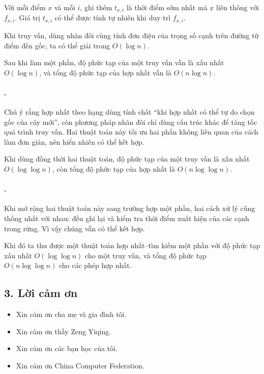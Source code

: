 \documentclass[11pt]{article}
\begin{document}
Với mỗi điểm \(x\) và mỗi \(i\), ghi thêm \(t_{x,i}\) là thời điểm sớm nhất
mà \(x\) liên thông với \(f_{x,i}\). Giá trị \(t_{x,i}\) có thể được tính tự
nhiên khi duy trì \(f_{x,i}\).

Khi truy vấn, dùng nhân đôi cùng tính đơn điệu của trọng số cạnh trên đường từ
điểm đến gốc, ta có thể giải trong \(O(\log n)\).

Sau khi làm  một phần, độ phức tạp của một truy vấn vẫn là
xấu nhất \(O(\log n)\), và tổng độ phức tạp của hợp nhất vẫn là
\(O(n\log n)\).

\paragraph{.}
Chú ý rằng hợp nhất theo hạng dùng tính chất ``khi hợp nhất có thể tự do chọn
gốc của cây mới'', còn phương pháp nhân đôi chỉ dùng cấu trúc khác để tăng tốc
quá trình truy vấn. Hai thuật toán này tối ưu hai phần không liên quan của
cách làm đơn giản, nên hiển nhiên có thể kết hợp.

Khi dùng đồng thời hai thuật toán, độ phức tạp của một truy vấn là xấu nhất
\(O(\log\log n)\), còn tổng độ phức tạp của hợp nhất là
\(O(n\log\log n)\).

\paragraph{.}
Khi mở rộng hai thuật toán này sang trường hợp  một phần, hai
cách xử lý cũng thống nhất với nhau: đều ghi lại và kiểm tra thời điểm xuất
hiện của các cạnh trong rừng. Vì vậy chúng vẫn có thể kết hợp.

Khi đó ta thu được một thuật toán hợp nhất--tìm kiếm  một
phần với độ phức tạp xấu nhất \(O(\log\log n)\) cho một truy vấn, và tổng độ
phức tạp \(O(n\log\log n)\) cho các phép hợp nhất.

\subsection*{3. Lời cảm ơn}

\begin{itemize}
  \item Xin cảm ơn cha mẹ và gia đình tôi.
  \item Xin cảm ơn thầy Zeng Yiqing.
  \item Xin cảm ơn các bạn học của tôi.
  \item Xin cảm ơn China Computer Federation.
\end{itemize}
\end{document}
